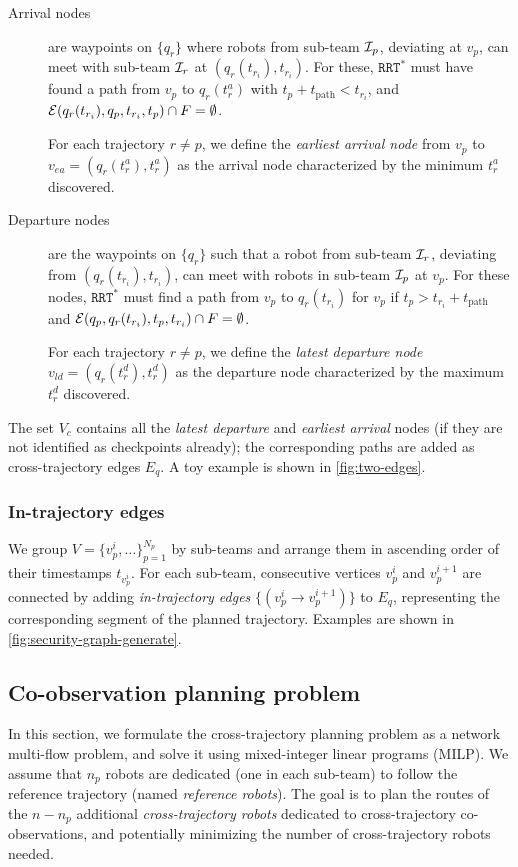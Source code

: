 \documentclass[10pt,twocolumn,twoside]{IEEEtran}
\newcommand{\rrtstar}{$\texttt{RRT}^\texttt{*}$}
\begin{document}
\begin{description}
\item[Arrival nodes] are waypoints on $\{q_r\}$ where robots from sub-team $\mathcal{I}_p$, deviating at $v_p$, can meet with sub-team $\mathcal{I}_r$ at $(q_r(t_{r_i}),t_{r_i})$. For these, \rrtstar{} must have found a path from $v_p$ to $q_{r}(t^{a}_r)$ with $t_{p}+t_{\textrm{path}}<t_{{r}_{i}}$, and $\mathcal{E}(q_{r}(t_{{r}_{i}}),q_{p},t_{{r}_{i}},t_{p}) \cap F = \emptyset$.

For each trajectory $r\neq p$, we define the \emph{earliest arrival node} from $v_p$ to $v_{ea} = (q_{r}(t^{a}_r),t^{a}_r)$ as the arrival node characterized by the minimum $t^{a}_r$ discovered. 

\item[Departure nodes] are the waypoints on $\{q_r\}$ such that a robot from sub-team $\mathcal{I}_r$, deviating from $(q_{r}(t_{{r}_{i}}),t_{{r}_{i}})$, can meet with robots in sub-team $\mathcal{I}_p$ at $v_{p}$. For these nodes, \rrtstar{} must find a path from $v_p$ to $q_{r}(t_{{r}_{i}})$ for $v_p$ if  $t_{p}>t_{{r}_{i}}+t_{\textrm{path}}$ and $\mathcal{E}(q_{p}, q_{r}(t_{{r}_{i}}),t_{p}, t_{{r}_{i}}) \cap F = \emptyset$. 

For each trajectory $r\neq p$, we define the \emph{latest departure node} $v_{ld}=(q_{r}(t^{d}_r),t^{d}_r)$ as the departure node characterized by the maximum $t^{d}_r$ discovered.
\end{description}

The set $V_c$ contains all the \emph{latest departure} and \emph{earliest arrival} nodes (if they are not identified as checkpoints already); the corresponding paths are added as cross-trajectory edges $E_q$. A toy example is shown in \cref{fig:two-edges}.

\subsubsection{In-trajectory edges}\label{sec:Graph-intro}
We group $V =\{ v^i_p,\dots\}_{p=1}^{N_p}$ by sub-teams and arrange them in ascending order of their timestamps $t_{v^i_{p}}$. For each sub-team, consecutive vertices $v^i_{p}$ and $v^{i+1}_{p}$ are connected by adding \emph{in-trajectory edges} $\{(v^i_{p}\rightarrow v^{i+1}_{p})\}$ to $E_q$, representing the corresponding segment of the planned trajectory. Examples are shown in \cref{fig:security-graph-generate}. 

\subsection{Co-observation planning problem}
In this section, we formulate the cross-trajectory planning problem as a network multi-flow problem, and solve it using mixed-integer linear programs (MILP). We assume that $n_p$ robots are dedicated (one in each sub-team) to follow the reference trajectory (named \emph{reference robots}). The goal is to plan the routes of the $n-n_p$ additional \emph{cross-trajectory robots} dedicated to cross-trajectory co-observations, and potentially minimizing the number of cross-trajectory robots needed. 
\end{document}

